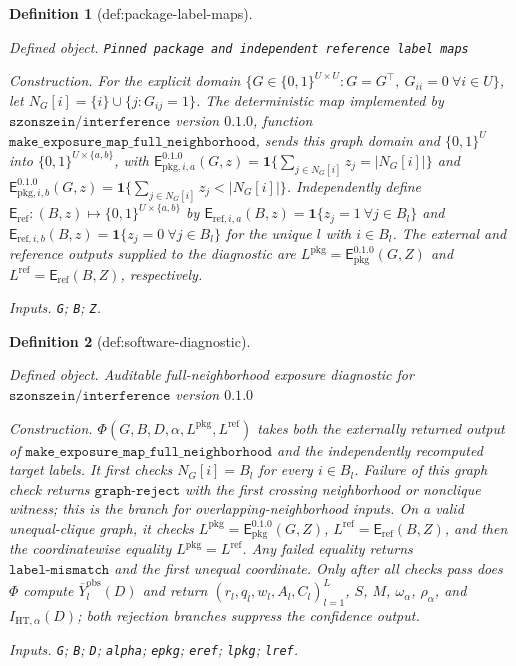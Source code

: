 \documentclass{article}
\newtheorem{definition}{Definition}
\begin{document}
\begin{definition}[def:package-label-maps]\label{def:package-label-maps}
\par\smallskip\noindent\emph{Defined object.} \texttt{Pinned package and independent reference label maps}
\par\smallskip\noindent\emph{Construction.} For the explicit domain \(\{G\in\{0,1\}^{U\times U}:G=G^\top,\ G_{ii}=0\ \forall i\in U\}\), let \(N_G[i]=\{i\}\cup\{j:G_{ij}=1\}\). The deterministic map implemented by \(\texttt{szonszein/interference}\) version \(0.1.0\), function \(\texttt{make\_exposure\_map\_full\_neighborhood}\), sends this graph domain and \(\{0,1\}^U\) into \(\{0,1\}^{U\times\{a,b\}}\), with \(\mathsf E_{\mathrm{pkg},i,a}^{0.1.0}(G,z)=\mathbf 1\{\sum_{j\in N_G[i]}z_j=|N_G[i]|\}\) and \(\mathsf E_{\mathrm{pkg},i,b}^{0.1.0}(G,z)=\mathbf 1\{\sum_{j\in N_G[i]}z_j<|N_G[i]|\}\). Independently define \(\mathsf E_{\mathrm{ref}}:(B,z)\mapsto\{0,1\}^{U\times\{a,b\}}\) by \(\mathsf E_{\mathrm{ref},i,a}(B,z)=\mathbf 1\{z_j=1\ \forall j\in B_l\}\) and \(\mathsf E_{\mathrm{ref},i,b}(B,z)=\mathbf 1\{z_j=0\ \forall j\in B_l\}\) for the unique \(l\) with \(i\in B_l\). The external and reference outputs supplied to the diagnostic are \(L^{\mathrm{pkg}}=\mathsf E_{\mathrm{pkg}}^{0.1.0}(G,Z)\) and \(L^{\mathrm{ref}}=\mathsf E_{\mathrm{ref}}(B,Z)\), respectively.
\par\smallskip\noindent\emph{Inputs.} \texttt{G}; \texttt{B}; \texttt{Z}.
\end{definition}

\begin{definition}[def:software-diagnostic]\label{def:software-diagnostic}
\par\smallskip\noindent\emph{Defined object.} Auditable full-neighborhood exposure diagnostic for \(\texttt{szonszein/interference}\) version \(0.1.0\)
\par\smallskip\noindent\emph{Construction.} \(\Phi(G,B,D,\alpha,L^{\mathrm{pkg}},L^{\mathrm{ref}})\) takes both the externally returned output of \(\texttt{make\_exposure\_map\_full\_neighborhood}\) and the independently recomputed target labels. It first checks \(N_G[i]=B_l\) for every \(i\in B_l\). Failure of this graph check returns \(\texttt{graph-reject}\) with the first crossing neighborhood or nonclique witness; this is the branch for overlapping-neighborhood inputs. On a valid unequal-clique graph, it checks \(L^{\mathrm{pkg}}=\mathsf E_{\mathrm{pkg}}^{0.1.0}(G,Z)\), \(L^{\mathrm{ref}}=\mathsf E_{\mathrm{ref}}(B,Z)\), and then the coordinatewise equality \(L^{\mathrm{pkg}}=L^{\mathrm{ref}}\). Any failed equality returns \(\texttt{label-mismatch}\) and the first unequal coordinate. Only after all checks pass does \(\Phi\) compute \(\overline Y_l^{\mathrm{obs}}(D)\) and return \((r_l,q_l,w_l,A_l,C_l)_{l=1}^L\), \(S\), \(M\), \(\omega_\alpha\), \(\rho_\alpha\), and \(I_{\mathrm{HT},\alpha}(D)\); both rejection branches suppress the confidence output.
\par\smallskip\noindent\emph{Inputs.} \texttt{G}; \texttt{B}; \texttt{D}; \texttt{alpha}; \texttt{epkg}; \texttt{eref}; \texttt{lpkg}; \texttt{lref}.
\end{definition}
\end{document}
